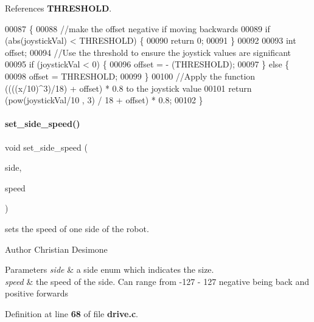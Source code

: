 References \textbf{ T\+H\+R\+E\+S\+H\+O\+LD}.


\begin{DoxyCode}
00087                                           \{
00088     \textcolor{comment}{//make the offset negative if moving backwards}
00089     \textcolor{keywordflow}{if} (abs(joystickVal) < THRESHOLD) \{
00090             \textcolor{keywordflow}{return} 0;
00091     \}
00092 
00093     \textcolor{keywordtype}{int} offset;
00094   \textcolor{comment}{//Use the threshold to ensure the joystick values are significant}
00095     \textcolor{keywordflow}{if} (joystickVal < 0) \{
00096         offset = - (THRESHOLD);
00097     \} \textcolor{keywordflow}{else} \{
00098         offset = THRESHOLD;
00099     \}
00100   \textcolor{comment}{//Apply the function ((((x/10)^3)/18) + offset) * 0.8 to the joystick value}
00101     \textcolor{keywordflow}{return} (pow(joystickVal/10 , 3) / 18 + offset) * 0.8;
00102 \}
\end{DoxyCode}
\mbox{\label{drive_8c_a8df41fd50094c065eedc81fc5e6595d1}} 
\paragraph{set\+\_\+side\+\_\+speed()}
{\footnotesize\ttfamily void set\+\_\+side\+\_\+speed (\begin{DoxyParamCaption}\item[{\textbf{ side\+\_\+t}}]{side,  }\item[{int}]{speed }\end{DoxyParamCaption})}



sets the speed of one side of the robot. 

\begin{DoxyAuthor}{Author}
Christian Desimone 
\end{DoxyAuthor}

\begin{DoxyParams}{Parameters}
{\em side} & a side enum which indicates the size. \\
\hline
{\em speed} & the speed of the side. Can range from -\/127 -\/ 127 negative being back and positive forwards \\
\hline
\end{DoxyParams}


Definition at line \textbf{ 68} of file \textbf{ drive.\+c}.



